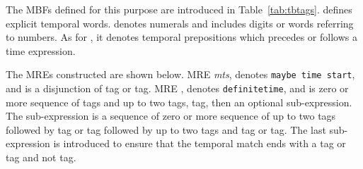 \begin{appendices}
The MBFs defined for this purpose are introduced in Table~\ref{tab:tbtags}. 
 defines explicit temporal words. 
 denotes numerals and includes digits or words referring to numbers. 
As for , it denotes temporal prepositions which precedes or follows a time expression.

\begin{table}[tb!]
  \centering
  \caption{Temporal MBFs}
  \label{tab:tbtags}%
\end{table}%

The \framework MREs constructed are shown below. 
MRE {\em mts}, denotes {\tt maybe time start}, and is a disjunction of  tag or  tag. 
MRE , denotes {\tt definitetime}, and is zero or more sequence of  tags and up to two 
 tags,  tag, then an optional sub-expression. 
The sub-expression is a sequence of zero or more sequence of up to two  tags followed by  tag or  tag followed by up to two  tags and  tag or  tag. 
The last sub-expression  is introduced to ensure that the temporal match ends with a  tag or  tag and not  tag.


\end{appendices}
